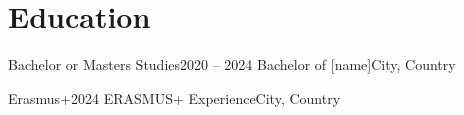 \section{\faGraduationCap \hspace{0.1cm} Education}
  \resumeSubHeadingListStart
      \resumeSubheading
      {Bachelor or Masters Studies}{2020 -- 2024}
      {Bachelor of [name]}{City, Country}

      \resumeSubheading
      {Erasmus+}{2024}
      {ERASMUS+ Experience}{City, Country}
  \resumeSubHeadingListEnd
